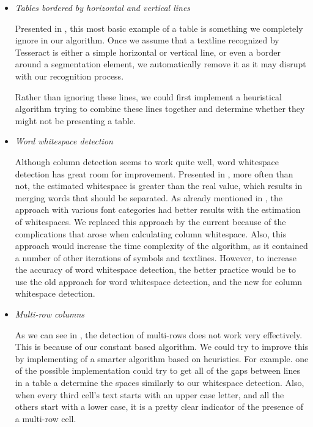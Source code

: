 \begin{itemize}
    \item \emph{Tables bordered by horizontal and vertical lines}
    
    Presented in , this most basic example of a table is something we completely ignore in our algorithm. Once we assume that a textline recognized by Tesseract is either a simple horizontal or vertical line, or even a border around a segmentation element, we automatically remove it as it may disrupt with our recognition process.
    
    Rather than ignoring these lines, we could first implement a heuristical algorithm trying to combine these lines together and determine whether they might not be presenting a table.
    
    \item \emph{Word whitespace detection}
    
    Although column detection seems to work quite well, word whitespace detection has great room for improvement. Presented in , more often than not, the estimated whitespace is greater than the real value, which results in merging words that should be separated. As already mentioned in , the approach with various font categories had better results with the estimation of whitespaces. We replaced this approach by the current because of the complications that arose when calculating column whitespace. Also, this approach would increase the time complexity of the algorithm, as it contained a number of other iterations of symbols and textlines. However, to increase the accuracy of word whitespace detection, the better practice would be to use the old approach for word whitespace detection, and the new for column whitespace detection. 
    
    \item \emph{Multi-row columns}
    
    As we can see in , the detection of multi-rows does not work very effectively. This is because of our constant based algorithm. We could try to improve this by implementing of a smarter algorithm based on heuristics. For example. one of the possible implementation could try to get all of the gaps between lines in a table a determine the spaces similarly to our whitespace detection. Also, when every third cell's text starts with an upper case letter, and all the others start with a lower case, it is a pretty clear indicator of the presence of a multi-row cell.
    

\end{itemize}
